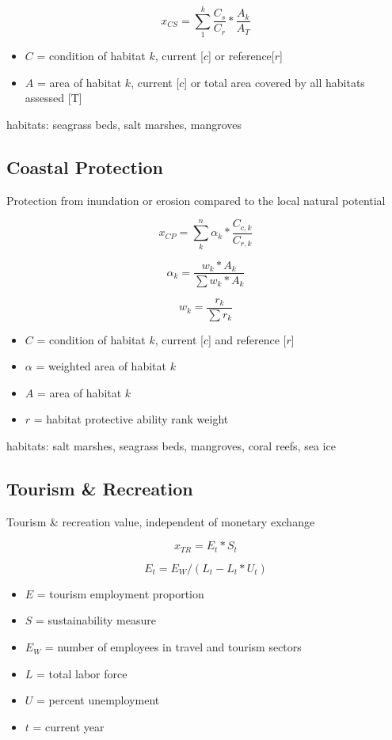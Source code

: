 \documentclass[
]{article}
\begin{document}
\[
x_{CS} =  \sum_{1}^{k} \frac{C_{s}}{C_{r}} * \frac{A_{k}}{A_{T}}
\]

\begin{itemize}
\item
  \(C\) = condition of habitat \(k\), current {[}\(c\){]} or
  reference{[}\(r\){]}
\item
  \(A\) = area of habitat \(k\), current {[}\(c\){]} or total area
  covered by all habitats assessed {[}T{]}
\end{itemize}

habitats: seagrass beds, salt marshes, mangroves

\hypertarget{coastal-protection}{%
\subsection{Coastal Protection}\label{coastal-protection}}

Protection from inundation or erosion compared to the local natural
potential

\[
x_{CP} =  \sum_{k}^{n} \alpha_{k} * \frac{C_{c,k}}{C_{r,k}}
\]

\[
\alpha_{k} = \frac{w_{k}*A_{k}}{\sum{w_{k}*A_{k}}}
\]

\[
w_{k} = \frac{r_{k}}{\sum{r_{k}}}
\]

\begin{itemize}
\item
  \(C\) = condition of habitat \(k\), current {[}\(c\){]} and reference
  {[}\(r\){]}
\item
  \(\alpha\) = weighted area of habitat \(k\)
\item
  \(A\) = area of habitat \(k\)
\item
  \(r\) = habitat protective ability rank weight
\end{itemize}

habitats: salt marshes, seagrass beds, mangroves, coral reefs, sea ice

\hypertarget{tourism-recreation}{%
\subsection{Tourism \& Recreation}\label{tourism-recreation}}

Tourism \& recreation value, independent of monetary exchange

\[
x_{TR} = E_{t} * S_{t} 
\]

\[
E_{t} = E_{W} / (L_{t} - L_{t} * U_{t})
\]

\begin{itemize}
\item
  \(E\) = tourism employment proportion
\item
  \(S\) = sustainability measure
\item
  \(E_{W}\) = number of employees in travel and tourism sectors
\item
  \(L\) = total labor force
\item
  \(U\) = percent unemployment
\item
  \(t\) = current year
\end{itemize}
\end{document}
